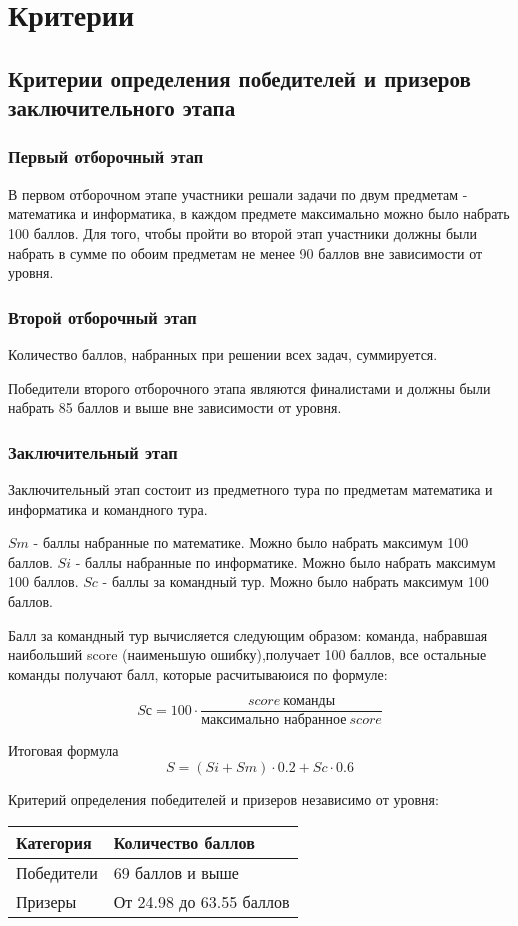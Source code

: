 \part{Критерии}

\chapter{Критерии определения победителей и призеров заключительного этапа}

\section{Первый отборочный этап}
 
В первом отборочном этапе участники решали задачи по двум предметам - математика и информатика, в каждом предмете максимально можно было набрать 100 баллов. Для того, чтобы пройти во второй этап участники должны были набрать в сумме по обоим предметам не менее 90 баллов вне зависимости от уровня.

\section{Второй отборочный этап}

Количество баллов, набранных при решении всех задач, суммируется. 

Победители второго отборочного этапа являются финалистами и должны были набрать 85 баллов и выше вне зависимости от уровня.

\section{Заключительный этап}

Заключительный этап состоит из предметного тура по предметам математика и информатика и командного тура.

$Sm$ - баллы набранные по математике. Можно было набрать максимум 100 баллов.
$Si$ - баллы набранные по информатике. Можно было набрать максимум 100 баллов.
$Sc$ - баллы за командный тур. Можно было набрать максимум 100 баллов.

Балл за командный тур вычисляется следующим образом: команда, набравшая наибольший score (наименьшую ошибку),получает 100 баллов, все остальные команды получают балл, которые расчитываюися по формуле:

$$Sс = 100 \cdot \frac{score \: \text{команды}}{\text{максимально набранное} \: score}$$
 
Итоговая формула $$S = (Si + Sm) \cdot 0.2 + Sc \cdot 0.6$$

Критерий определения победителей и призеров независимо от уровня:
\begin{center}
    \begin{tabular}{|l|l|}
        \hline
        Категория&Количество баллов\\
        \hline
        Победители&69 баллов и выше\\
        \hline
        Призеры&От 24.98 до 63.55 баллов\\
        \hline
    \end{tabular}
\end{center}